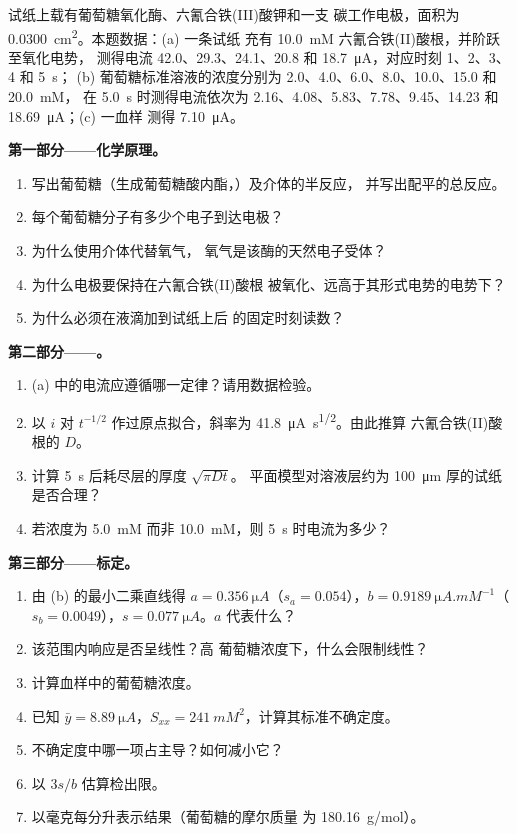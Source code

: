 \begin{problem}
\label{pb:b3:electrode-kinetics:1}
试纸上载有葡萄糖氧化酶、六氰合铁(III)酸钾和一支
碳工作电极，面积为 \qty{0.0300}{cm^2}。本题数据：(a) 一条试纸
充有 \qty{10.0}{mM} 六氰合铁(II)酸根，并阶跃至氧化电势，
测得电流 42.0、29.3、24.1、20.8 和 \qty{18.7}{\micro A}，对应时刻 1、2、3、4 和 \qty{5}{s}；
(b) 葡萄糖标准溶液的浓度分别为 2.0、4.0、6.0、8.0、10.0、15.0 和 \qty{20.0}{mM}，
在 \qty{5.0}{s} 时测得电流依次为 2.16、4.08、5.83、7.78、9.45、14.23 和 \qty{18.69}{\micro A}；(c) 一血样
测得 \qty{7.10}{\micro A}。

\medskip\noindent\textbf{第一部分——化学原理。}
\begin{enumerate}
  \item 写出葡萄糖（生成葡萄糖酸内酯，）及介体的半反应，
        并写出配平的总反应。
  \item 每个葡萄糖分子有多少个电子到达电极？
  \item 为什么使用介体代替氧气，
        氧气是该酶的天然电子受体？
  \item 为什么电极要保持在六氰合铁(II)酸根
        被氧化、远高于其形式电势的电势下？
  \item 为什么必须在液滴加到试纸上后
        的固定时刻读数？
\end{enumerate}

\medskip\noindent\textbf{第二部分——。}
\begin{enumerate}[resume]
  \item (a) 中的电流应遵循哪一定律？请用数据检验。
  \item 以 $i$ 对 $t^{-1/2}$ 作过原点拟合，斜率为 \qty{41.8}{\micro A.s^{1/2}}。由此推算
        六氰合铁(II)酸根的 $D$。
  \item 计算 \qty{5}{s} 后耗尽层的厚度 $\sqrt{\pi Dt}$。
        平面模型对溶液层约为
        \qty{100}{\micro m} 厚的试纸是否合理？
  \item 若浓度为 \qty{5.0}{mM} 而非 \qty{10.0}{mM}，则 \qty{5}{s} 时电流为多少？
\end{enumerate}

\medskip\noindent\textbf{第三部分——标定。}
\begin{enumerate}[resume]
  \item 由 (b) 的最小二乘直线得 $a = \qty{0.356}{\micro A}$（$s_a = 0.054$），$b =
        \qty{0.9189}{\micro A.mM^{-1}}$（$s_b = 0.0049$），$s = \qty{0.077}{\micro A}$。$a$ 代表什么？
  \item 该范围内响应是否呈线性？高
        葡萄糖浓度下，什么会限制线性？
  \item 计算血样中的葡萄糖浓度。
  \item 已知 $\bar y = \qty{8.89}{\micro A}$，$S_{xx} = \qty{241}{mM^2}$，计算其标准不确定度。
  \item 不确定度中哪一项占主导？如何减小它？
  \item 以 $3s/b$ 估算检出限。
  \item 以毫克每分升表示结果（葡萄糖的摩尔质量
        为 \qty{180.16}{g/mol}）。
\end{enumerate}


\end{problem}
